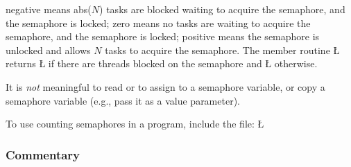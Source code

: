 \documentclass[openright,twoside]{report}
\begin{document}
negative means abs($N$) tasks are blocked waiting to acquire the semaphore, and the semaphore is locked;
zero means no tasks are waiting to acquire the semaphore, and the semaphore is locked;
positive means the semaphore is unlocked and allows $N$ tasks to acquire the semaphore.
The member routine \LGinlinetrue\LGbegin\lgrinde\L{}\endlgrinde\LGend{} returns \LGinlinetrue\LGbegin\lgrinde\L{}\endlgrinde\LGend{} if there are threads blocked on the semaphore and \LGinlinetrue\LGbegin\lgrinde\L{}\endlgrinde\LGend{} otherwise.

It is \emph{not} meaningful to read or to assign to a semaphore variable, or copy a semaphore variable (e.g., pass it as a value parameter).

To use counting semaphores in a \uC program, include the file:
\LGinlinefalse\LGbegin\lgrinde
\L{}
\endlgrinde\LGend
{}%


\subsubsection{Commentary}
\end{document}
